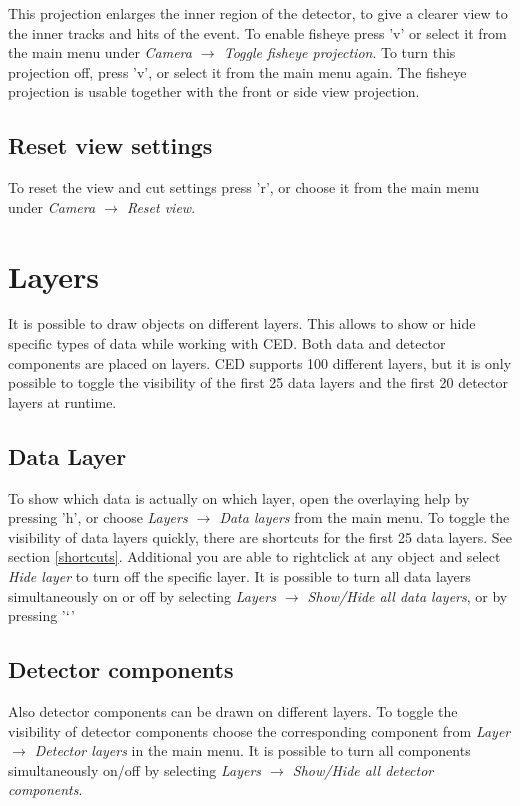 \documentclass[a4paper,10pt]{article}
\begin{document}
This projection enlarges the inner region of the detector, to give a clearer view to the inner tracks and hits of the event. To enable fisheye press 'v' or select it from the main menu under 
\textit{Camera $\rightarrow$ Toggle fisheye projection}. 
To turn this projection off, press 'v', or select it from the main menu again. The fisheye projection is usable together with the front or side view projection.


\subsection{Reset view settings}
To reset the view and cut settings press 'r', or choose it from the main menu under \textit{Camera $\rightarrow$ Reset view}. 



\section{Layers}
It is possible to draw objects on different layers. 
This allows to show or hide specific types of data while working with CED. 
Both data and detector components are placed on layers. 
CED supports 100 different layers, but it is only possible to toggle the visibility of the first 25 data layers and the first 20 detector layers at runtime. 

\subsection{Data Layer}
To show which data is actually on which layer, open the overlaying help by pressing 'h', or choose \textit{Layers $\to$ Data layers} from the main  menu. 
To toggle the visibility of data layers quickly, there are shortcuts for the first 25 data layers. See section \ref{shortcuts}. 
Additional you are able to rightclick at any object and select \textit{Hide layer} to turn off the specific layer.
It is possible to turn all data layers simultaneously on or off by selecting \textit{Layers $\to$ Show/Hide all data layers}, or by pressing '$`$'

\subsection{Detector components}
Also detector components can be drawn on different layers. 
To toggle the visibility of detector components choose the corresponding component from \textit{Layer $\to$ Detector layers} in the main menu. 
It is possible to turn all components simultaneously on/off by selecting \textit{Layers $\to$ Show/Hide all detector components}. 
\end{document}
